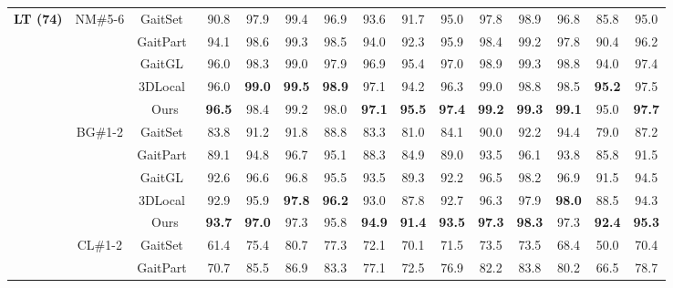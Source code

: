 \documentclass[runningheads]{llncs}
\begin{document}
\begin{table*}[ht]
{\begin{tabular}{c|c|c|c|c|c|c|c|c|c|c|c|c|c|c}
    \multicolumn{1}{c|}{\multirow{15}[2]{*}{\textbf{LT (74)}}} & \multicolumn{1}{c|}{\multirow{5}[2]{*}{NM\#5-6}} & GaitSet~\cite{aaai2019gaitset} & 90.8  & 97.9  & 99.4  & 96.9  & 93.6  & 91.7  & 95.0  & 97.8  & 98.9  & 96.8  & 85.8  & 95.0   \\
\cline{3-15}          &       & GaitPart~\cite{gaitpart} & 94.1  & 98.6  & 99.3  & 98.5  & 94.0  & 92.3  & 95.9  & 98.4  & 99.2  & 97.8  & 90.4  & 96.2   \\
\cline{3-15}          &       & \multicolumn{1}{c|}{GaitGL~\cite{gaitgl}} & 96.0  & 98.3  & 99.0  & 97.9  & 96.9  & 95.4  & 97.0  & 98.9  & 99.3  & 98.8  & 94.0  & 97.4   \\
\cline{3-15}          &       & \multicolumn{1}{c|}{3DLocal~\cite{3dlocal}} & 96.0  & \textbf{99.0} & \textbf{99.5} & \textbf{98.9} & 97.1  & 94.2  & 96.3  & 99.0  & 98.8  & 98.5  & \textbf{95.2} & 97.5   \\
\cline{3-15}          &       & Ours  & \textbf{96.5} & 98.4  & 99.2  & 98.0  & \textbf{97.1} & \textbf{95.5} & \textbf{97.4} & \textbf{99.2} & \textbf{99.3} & \textbf{99.1} & 95.0  & \textbf{97.7}  \\
\cline{2-15}          & \multicolumn{1}{c|}{\multirow{5}[2]{*}{BG\#1-2}} & GaitSet~\cite{aaai2019gaitset} & 83.8  & 91.2  & 91.8  & 88.8  & 83.3  & 81.0  & 84.1  & 90.0  & 92.2  & 94.4  & 79.0  & 87.2   \\
\cline{3-15}          &       & GaitPart~\cite{gaitpart} & 89.1  & 94.8  & 96.7  & 95.1  & 88.3  & 84.9  & 89.0  & 93.5  & 96.1  & 93.8  & 85.8  & 91.5   \\
\cline{3-15}          &       & \multicolumn{1}{c|}{GaitGL~\cite{gaitgl}} & 92.6  & 96.6  & 96.8  & 95.5  & 93.5  & 89.3  & 92.2  & 96.5  & 98.2  & 96.9  & 91.5  & 94.5   \\
\cline{3-15}          &       & \multicolumn{1}{c|}{3DLocal~\cite{3dlocal}} & 92.9  & 95.9  & \textbf{97.8} & \textbf{96.2} & 93.0  & 87.8  & 92.7  & 96.3  & 97.9  & \textbf{98.0} & 88.5  & 94.3   \\
\cline{3-15}          &       & Ours  & \textbf{93.7} & \textbf{97.0} & 97.3  & 95.8  & \textbf{94.9} & \textbf{91.4} & \textbf{93.5} & \textbf{97.3} & \textbf{98.3} & 97.3  & \textbf{92.4} & \textbf{95.3}  \\
\cline{2-15}          & \multicolumn{1}{c|}{\multirow{5}[2]{*}{CL\#1-2}} & GaitSet~\cite{aaai2019gaitset} & 61.4  & 75.4  & 80.7  & 77.3  & 72.1  & 70.1  & 71.5  & 73.5  & 73.5  & 68.4  & 50.0  & 70.4   \\
\cline{3-15}          &       & GaitPart~\cite{gaitpart} & 70.7  & 85.5  & 86.9  & 83.3  & 77.1  & 72.5  & 76.9  & 82.2  & 83.8  & 80.2  & 66.5  & 78.7   \\

\end{tabular}}
\end{table*}
\end{document}
